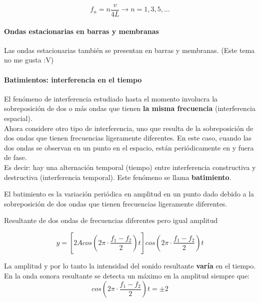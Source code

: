 \documentclass[10pt]{article}
\begin{document}
\begin{equation*}
	f_n = n\dfrac{v}{4L} \rightarrow n = 1,3,5,...
\end{equation*}

\paragraph{Ondas estacionarias en barras
y membranas}

Las ondas estacionarias también se presentan en barras y membranas. (Este tema no me gusta :V)

\paragraph{Batimientos: interferencia en el tiempo}
El fenómeno de interferencia estudiado hasta el momento involucra la sobreposición de
dos o más ondas que tienen \textbf{la misma frecuencia} (interferencia espacial).\\
\linebreak
Ahora considere otro tipo de interferencia, uno que resulta de la sobreposición de dos
ondas que tienen frecuencias ligeramente diferentes. En este caso, cuando las dos ondas se
observan en un punto en el espacio, están periódicamente en y fuera de fase.\\
Es decir: hay una alternación temporal (tiempo) entre interferencia constructiva y destructiva (interferencia temporal). 
Este fenómeno se llama \textbf{batimiento}.

\begin{center}
El batimiento es la variación periódica en amplitud en un punto dado debido a la
sobreposición de dos ondas que tienen frecuencias ligeramente diferentes.
\end{center}
\begin{center}
	Resultante de dos ondas
de frecuencias diferentes
pero igual amplitud
\end{center}

\begin{equation*}
	y = \left[ 2Acos\left(2\pi \cdot \dfrac{f_1-f_2}{2}\right) t\right] cos \left( 2\pi \cdot \dfrac{f_1-f_2}{2} \right)t
\end{equation*}

La amplitud y por lo tanto la intensidad del sonido resultante \textbf{varía} en el tiempo. \\
\linebreak
En la onda sonora resultante se detecta un máximo en la amplitud siempre que:
\begin{equation*}
cos \left( 2\pi \cdot \dfrac{f_1-f_2}{2} \right)t = \pm 2
\end{equation*}
\end{document}
